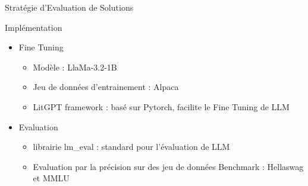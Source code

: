 \begin{frame}{Stratégie d'Evaluation de Solutions}
    \begin{block}{Implémentation}
        \begin{itemize}
            \item Fine Tuning
            \begin{itemize}
                \item Modèle : LlaMa-3.2-1B
                \item Jeu de données d'entrainement : Alpaca
                \item LitGPT framework : basé sur Pytorch, facilite le Fine Tuning de LLM
            \end{itemize}
            \item Evaluation
            \begin{itemize}
                \item librairie lm\_eval : standard pour l'évaluation de LLM
                \item Evaluation par la précision sur des jeu de données Benchmark : Hellaswag et MMLU
            \end{itemize}
        \end{itemize}

        
    \end{block}

\end{frame}

